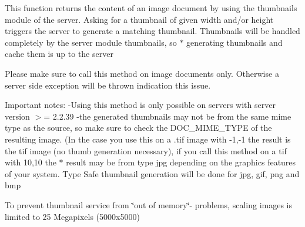 This function returns the content of an image document by using the thumbnails module of the server. Asking for a thumbnail of given width and/or height triggers the server to generate a matching thumbnail. Thumbnails will be handled completely by the server module thumbnails, so $\ast$ generating thumbnails and cache them is up to the server

Please make sure to call this method on image documents only. Otherwise a server side exception will be thrown indication this issue.

Important notes: -\/Using this method is only possible on servers with server version $>$= 2.2.39 -\/the generated thumbnails may not be from the same mime type as the source, so make sure to check the DOC\_\-MIME\_\-TYPE of the resulting image. (In the case you use this on a .tif image with -\/1,-\/1 the result is the tif image (no thumb generation necessary), if you call this method on a tif with 10,10 the $\ast$ result may be from type jpg depending on the graphics features of your system. Type Safe thumbnail generation will be done for jpg, gif, png and bmp
\begin{DoxyItemize}
\item To prevent thumbnail service from \char`\"{}out of memory\char`\"{}-\/ problems, scaling images is limited to 25 Megapixels (5000x5000)
\end{DoxyItemize}


